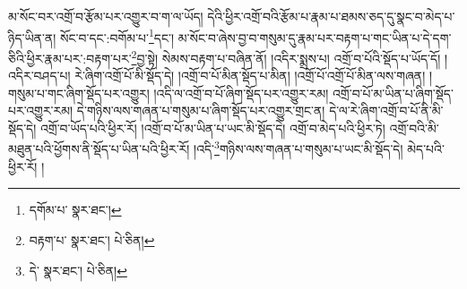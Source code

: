 མ་སོང་བར་འགྲོ་བ་རྩོམ་པར་འགྱུར་བ་ག་ལ་ཡོད། དེའི་ཕྱིར་འགྲོ་བའི་རྩོམ་པ་རྣམ་པ་ཐམས་ཅད་དུ་སྣང་བ་མེད་པ་ཉིད་ཡིན་ན། སོང་བ་དང་:བགོམ་པ་\footnote{དགོམ་པ་  སྣར་ཐང་། }དང་། མ་སོང་བ་ཞེས་བྱ་བ་གསུམ་དུ་རྣམ་པར་བརྟག་པ་གང་ཡིན་པ་དེ་དག་ཅིའི་ཕྱིར་རྣམ་པར་:བརྟག་པར་\footnote{བརྟག་པ་  སྣར་ཐང་།  པེ་ཅིན། }བྱ་སྟེ། སེམས་བརྟག་པ་བཞིན་ནོ། །འདིར་སྨྲས་པ། འགྲོ་བ་པོའི་སྡོད་པ་ཡོད་དོ། །འདིར་བཤད་པ། རེ་ཞིག་འགྲོ་པོ་མི་སྡོད་དེ། །འགྲོ་བ་པོ་མིན་སྡོད་པ་མིན། །འགྲོ་པོ་འགྲོ་པོ་མིན་ལས་གཞན། །གསུམ་པ་གང་ཞིག་སྡོད་པར་འགྱུར། །འདི་ལ་འགྲོ་བ་པོ་ཞིག་སྡོད་པར་འགྱུར་རམ། འགྲོ་བ་པོ་མ་ཡིན་པ་ཞིག་སྡོད་པར་འགྱུར་རམ། དེ་གཉིས་ལས་གཞན་པ་གསུམ་པ་ཞིག་སྡོད་པར་འགྱུར་གྲང་ན། དེ་ལ་རེ་ཞིག་འགྲོ་བ་པོ་ནི་མི་སྡོད་དེ། འགྲོ་བ་ཡོད་པའི་ཕྱིར་རོ། །འགྲོ་བ་པོ་མ་ཡིན་པ་ཡང་མི་སྡོད་དེ། འགྲོ་བ་མེད་པའི་ཕྱིར་ཏེ། འགྲོ་བའི་མི་མཐུན་པའི་ཕྱོགས་ནི་སྡོད་པ་ཡིན་པའི་ཕྱིར་རོ། །འདི་\footnote{དེ་  སྣར་ཐང་།  པེ་ཅིན། }གཉིས་ལས་གཞན་པ་གསུམ་པ་ཡང་མི་སྡོད་དེ། མེད་པའི་ཕྱིར་རོ། །
